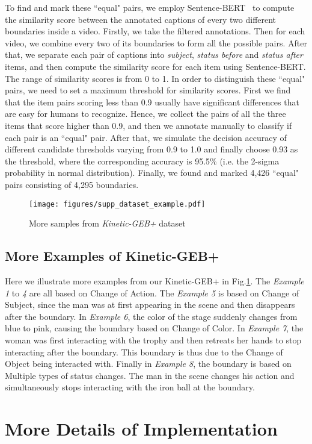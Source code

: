 \documentclass[runningheads]{llncs}
\begin{document}
To find and mark these ``equal" pairs, we employ Sentence-BERT~\cite{reimers2019sentence} to compute the similarity score between the annotated captions of every two different boundaries inside a video. Firstly, we take the filtered annotations. Then for each video, we combine every two of its boundaries to form all the possible pairs. After that, we separate each pair of captions into \textit{subject}, \textit{status before} and \textit{status after} items, and then compute the similarity score for each item using Sentence-BERT. The range of similarity scores is from 0 to 1.
In order to distinguish these ``equal" pairs, we need to set a maximum threshold for similarity scores. First we find that the item pairs scoring less than 0.9 usually have significant differences that are easy for humans to recognize. 
Hence, we collect the pairs of all the three items that score higher than 0.9, and then we annotate manually to classify if each pair is an ``equal" pair. After that, we simulate the decision accuracy of different candidate thresholds varying from 0.9 to 1.0 and finally choose 0.93 as the threshold, where the corresponding accuracy is 95.5\% (i.e. the 2-sigma probability in normal distribution). Finally, we found and marked 4,426 ``equal" pairs consisting of 4,295 boundaries.



\begin{figure}[]
\centering
\texttt{[image: figures/supp\_dataset\_example.pdf]}
\caption{More samples from \textit{Kinetic-GEB+} dataset}
\label{fig:supp_dataset_example}
\end{figure}

\subsection{More Examples of Kinetic-GEB+}

Here we illustrate more examples from our Kinetic-GEB+ in Fig.\ref{fig:supp_dataset_example}. The \textit{Example 1} to \textit{4} are all based on Change of Action. The \textit{Example 5} is based on Change of Subject, since the man was at first appearing in the scene and then disappears after the boundary. In \textit{Example 6}, the color of the stage suddenly changes from blue to pink, causing the boundary based on Change of Color. In \textit{Example 7}, the woman was first interacting with the trophy and then retreats her hands to stop interacting after the boundary. This boundary is thus due to the Change of Object being interacted with. Finally in \textit{Example 8}, the boundary is based on Multiple types of status changes. The man in the scene changes his action and simultaneously stops interacting with the iron ball at the boundary. \section{More Details of Implementation}
\label{supp-sec:imp-detail}
\end{document}
